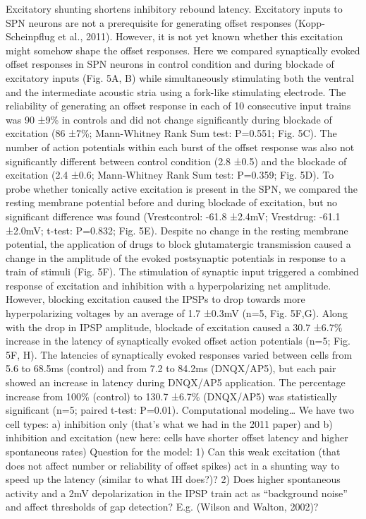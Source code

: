 \documentclass{article}
\begin{document}
Excitatory shunting shortens inhibitory rebound latency.
Excitatory inputs to SPN neurons are not a prerequisite for generating offset responses (Kopp-Scheinpflug et al., 2011). However, it is not yet known whether this excitation might somehow shape the offset responses. Here we compared synaptically evoked offset responses in SPN neurons in control condition and during blockade of excitatory inputs (Fig. 5A, B) while simultaneously stimulating both the ventral and the intermediate acoustic stria using a fork-like stimulating electrode. The reliability of generating an offset response in each of 10 consecutive input trains was 90 ±9\% in controls and did not change significantly during blockade of excitation (86 ±7\%; Mann-Whitney Rank Sum test: P=0.551; Fig. 5C). The number of action potentials within each burst of the offset response was also not significantly different between control condition (2.8 ±0.5) and the blockade of excitation (2.4 ±0.6; Mann-Whitney Rank Sum test: P=0.359; Fig. 5D). To probe whether tonically active excitation is present in the SPN, we compared the resting membrane potential before and during blockade of excitation, but no significant difference was found (Vrestcontrol: -61.8 ±2.4mV; Vrestdrug: -61.1 ±2.0mV; t-test: P=0.832; Fig. 5E). Despite no change in the resting membrane potential, the application of drugs to block glutamatergic transmission caused a change in the amplitude of the evoked postsynaptic potentials in response to a train of stimuli (Fig. 5F). The stimulation of synaptic input triggered a combined response of excitation and inhibition with a hyperpolarizing net amplitude.  However, blocking excitation caused the IPSPs to drop towards more hyperpolarizing voltages by an average of 1.7 ±0.3mV (n=5, Fig. 5F,G). Along with the drop in IPSP amplitude, blockade of excitation caused a 30.7 ±6.7\% increase in the latency of synaptically evoked offset action potentials (n=5; Fig. 5F, H). The latencies of synaptically evoked responses varied between cells from 5.6 to 68.5ms (control) and from 7.2 to 84.2ms (DNQX/AP5), but each pair showed an increase in latency during DNQX/AP5 application. The percentage increase from 100\% (control) to 130.7 ±6.7\% (DNQX/AP5) was statistically significant (n=5; paired t-test: P=0.01).
Computational modeling…
We have two cell types:	a) inhibition only (that’s what we had in the 2011 paper) and
b) inhibition and excitation (new here: cells have shorter offset latency and higher spontaneous rates)
Question for the model:	1) Can this weak excitation (that does not affect number or reliability of offset spikes) act in a shunting way to speed up the latency (similar to what IH does?)?
	2) Does higher spontaneous activity and a 2mV depolarization in the IPSP train act as “background noise” and affect thresholds of gap detection? E.g. (Wilson and Walton, 2002)?
\end{document}
